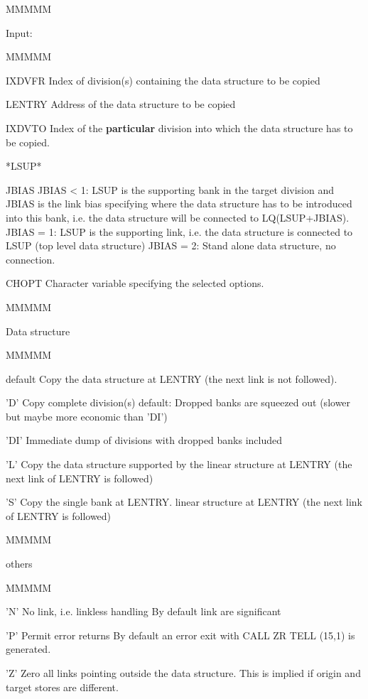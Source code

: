 \begin{DL}{MMMMM}
\item[Input:
]
\begin{DL}{MMMMM}
\item[IXDVFR
]Index of division(s) containing the data structure to be copied
\item[LENTRY
]Address of the data structure to be copied
\item[IXDVTO
]Index of the {\bf particular}
division into which the data structure has to be copied.
\item[*LSUP*
]
\item[JBIAS
]JBIAS < 1: LSUP is the supporting bank in the target division
and JBIAS is the link bias specifying where the data structure has to be
introduced into this bank, i.e. the data structure will be connected
to LQ(LSUP+JBIAS).
\newline JBIAS = 1: LSUP is the supporting link, i.e. the data structure
is connected to LSUP (top level data structure)
\newline JBIAS = 2: Stand alone data structure, no connection.
\item[CHOPT
]Character variable specifying the selected options.
\begin{DL}{MMMMM}
\item[Data structure
]
\begin{DL}{MMMMM}
\item[default
]Copy the data structure at LENTRY (the next link is not followed).
\item['D'
]Copy complete division(s)
\newline default: Dropped banks are squeezed out
\newline          (slower but maybe more economic than 'DI')
\item['DI'
]Immediate dump of divisions with dropped banks included
\item['L'
]Copy the data structure supported by the
linear structure at LENTRY (the next link of LENTRY is followed)
\item['S'
]Copy the single bank at LENTRY.
linear structure at LENTRY (the next link of LENTRY is followed)
\end{DL}
\end{DL}
\begin{DL}{MMMMM}
\item[others
]
\begin{DL}{MMMMM}
\item['N'
]No link, i.e. linkless handling
\newline By default link are significant
\item['P'
]Permit error returns
\newline By default an error exit with CALL ZR TELL (15,1) is generated.
\item['Z'
]Zero all links pointing outside the data structure.
\newline This is implied if origin and target stores are different.
\end{DL}
\end{DL}
\end{DL}
\end{DL}
